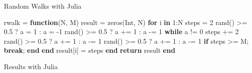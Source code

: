 \documentclass[ignorenonframetext,]{beamer}
\newenvironment{Shaded}{\begin{snugshade}}{\end{snugshade}}
\newcommand{\CommentTok}[1]{\textcolor[rgb]{0.56,0.35,0.01}{\textit{#1}}}
\newcommand{\DataTypeTok}[1]{\textcolor[rgb]{0.13,0.29,0.53}{#1}}
\newcommand{\FloatTok}[1]{\textcolor[rgb]{0.00,0.00,0.81}{#1}}
\newcommand{\KeywordTok}[1]{\textcolor[rgb]{0.13,0.29,0.53}{\textbf{#1}}}
\newcommand{\NormalTok}[1]{#1}
\newcommand{\OperatorTok}[1]{\textcolor[rgb]{0.81,0.36,0.00}{\textbf{#1}}}
\newcommand{\StringTok}[1]{\textcolor[rgb]{0.31,0.60,0.02}{#1}}
\begin{document}
\begin{frame}[fragile]{Random Walks with Julia}
\protect\hypertarget{random-walks-with-julia}{}

\begin{Shaded}
\begin{Highlighting}[]
\NormalTok{rwalk = }\KeywordTok{function}\NormalTok{(N, M)}
\NormalTok{    result = zeros(}\DataTypeTok{Int}\NormalTok{, N)}
    \KeywordTok{for}\NormalTok{ i }\KeywordTok{in} \FloatTok{1}\NormalTok{:N}
\NormalTok{        steps = }\FloatTok{2}
\NormalTok{        rand() >= }\FloatTok{0.5}\NormalTok{ ?  a = }\FloatTok{1}\NormalTok{ : a = -}\FloatTok{1}
\NormalTok{        rand() >= }\FloatTok{0.5}\NormalTok{ ? a += }\FloatTok{1}\NormalTok{ : a -= }\FloatTok{1}
        \KeywordTok{while}\NormalTok{ a != }\FloatTok{0}
\NormalTok{            steps += }\FloatTok{2}
\NormalTok{            rand() >= }\FloatTok{0.5}\NormalTok{ ? a += }\FloatTok{1}\NormalTok{ : a -= }\FloatTok{1}
\NormalTok{            rand() >= }\FloatTok{0.5}\NormalTok{ ? a += }\FloatTok{1}\NormalTok{ : a -= }\FloatTok{1}
            \KeywordTok{if}\NormalTok{ steps >= M; }\KeywordTok{break}\NormalTok{; }\KeywordTok{end}
        \KeywordTok{end}
\NormalTok{        result[i] = steps}
    \KeywordTok{end}
    \KeywordTok{return}\NormalTok{ result}
\KeywordTok{end}
\end{Highlighting}
\end{Shaded}

\end{frame}

\begin{frame}[fragile]{Results with Julia}
\protect\hypertarget{results-with-julia}{}

\begin{Shaded}
\end{Shaded}

\end{frame}
\end{document}
